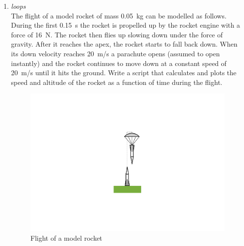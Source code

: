 \begin{enumerate}
\item \textit{ loops}\\
The flight of a model rocket of mass 0.05~kg can be modelled as follows. During the first 0.15~s the rocket is propelled up by the rocket engine with a force of 16~N. The rocket then flies up slowing down under the force of gravity. After it reaches the apex, the rocket starts to fall back down. When its down velocity reaches 20~m/s a parachute opens (assumed to open instantly) and the rocket continues to move down at a constant speed of 20~m/s until it hits the ground. Write a script that calculates and plots the speed and altitude of the rocket as a function of time during the flight.
\begin{figure}[h]
	\myfloatalign
	\includegraphics[width=0.15\linewidth]{Graphics/Additional-Ex/rocket}
	\caption{Flight of a model rocket}
	\label{fig:rocket}
\end{figure}


\end{enumerate}
